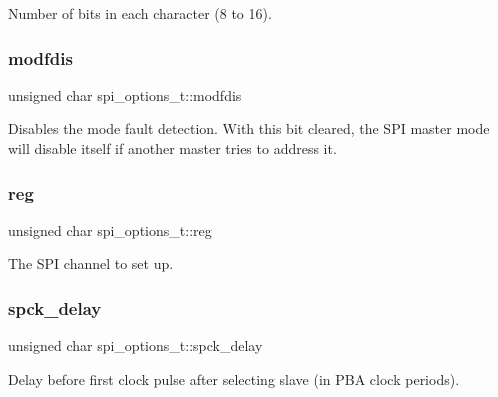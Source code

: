 Number of bits in each character (8 to 16). 

\mbox{\label{structspi__options__t_a25aaa6f8b4d65ae291edeb9e4c1c3b57}} 
\subsubsection{\texorpdfstring{modfdis}{modfdis}}
{\footnotesize\ttfamily unsigned char spi\+\_\+options\+\_\+t\+::modfdis}

Disables the mode fault detection. With this bit cleared, the S\+PI master mode will disable itself if another master tries to address it. \mbox{\label{structspi__options__t_a1e6dfa9b370d7e4f0b4e8d6cb75835a5}} 
\subsubsection{\texorpdfstring{reg}{reg}}
{\footnotesize\ttfamily unsigned char spi\+\_\+options\+\_\+t\+::reg}



The S\+PI channel to set up. 

\mbox{\label{structspi__options__t_aa9434f07d440208f42f817cb977f6a52}} 
\subsubsection{\texorpdfstring{spck\+\_\+delay}{spck\_delay}}
{\footnotesize\ttfamily unsigned char spi\+\_\+options\+\_\+t\+::spck\+\_\+delay}



Delay before first clock pulse after selecting slave (in P\+BA clock periods). 

\mbox{\label{structspi__options__t_a98a1b706e726c41dfb40c2b67719e722}} 
